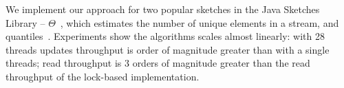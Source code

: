 We implement our approach for two popular sketches in the Java Sketches Library -- $\Theta$~\cite{Theta},
which estimates the number of unique elements in a stream, and quantiles~\cite{quantiles}.
Experiments show the algorithms scales almost linearly: with 28 threads updates throughput is order of magnitude greater than with a single threads; 
read throughput is 3 orders of magnitude greater than the read throughput of the lock-based implementation.  


 
